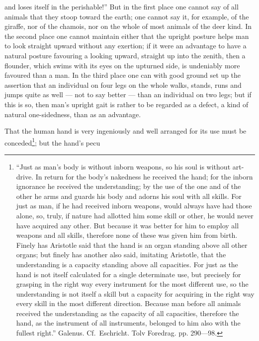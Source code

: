 \documentclass[12pt,a4paper]{book}
\begin{document}
\setcounter{footnote}{0}
and loses itself in the perishable!'' But in the first place one cannot say of all
animals that they stoop toward the earth; one cannot say it, for example, of the
giraffe, nor of the chamois, nor on the whole of most animals of the deer kind. In the
second place one cannot maintain either that the upright posture helps man to look
straight upward without any exertion; if it were an advantage to have a natural posture
favouring a looking upward, straight up into the zenith, then a flounder, which swims
with its eyes on the upturned side, is undeniably more favoured than a man. In the
third place one can with good ground set up the assertion that an individual on four
legs on the whole walks, stands, runs and jumps quite as well --- not to say better ---
than an individual on two legs; but if this is so, then man's upright gait is rather to
be regarded as a defect, a kind of natural one-sidedness, than as an advantage.

That the human hand is very ingeniously and well arranged for its use must be
conceded\footnote{``Just as man's body is without inborn weapons, so his soul is
without art-drive. In return for the body's nakedness he received the hand; for the
inborn ignorance he received the understanding; by the use of the one and of the other
he arms and guards his body and adorns his soul with all skills. For just as man, if he
had received inborn weapons, would always have had those alone, so, truly, if nature
had allotted him some skill or other, he would never have acquired any other. But
because it was better for him to employ all weapons and all skills, therefore none of
these was given him from birth. Finely has Aristotle said that the hand is an organ
standing above all other organs; but finely has another also said, imitating Aristotle,
that the understanding is a capacity standing above all capacities. For just as the
hand is not itself calculated for a single determinate use, but precisely for grasping
in the right way every instrument for the most different use, so the understanding is
not itself a skill but a capacity for acquiring in the right way every skill in the most
different direction. Because man before all animals received the understanding as the
capacity of all capacities, therefore the hand, as the instrument of all instruments,
belonged to him also with the fullest right.'' Galenus. Cf.\ Eschricht. Tolv Foredrag.
pp. 290---98.
}; but the hand's pecu%
\end{document}

